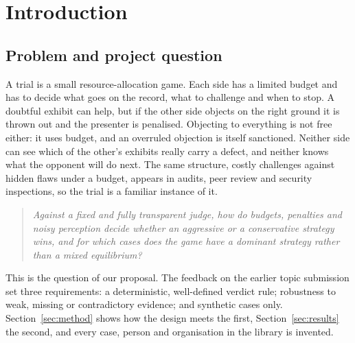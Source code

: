 \section{Introduction}\label{sec:intro}

\subsection{Problem and project question}
A trial is a small resource-allocation game. Each side has a limited budget and has to decide what goes on the record, what to challenge and when to stop. A doubtful exhibit can help, but if the other side objects on the right ground it is thrown out and the presenter is penalised. Objecting to everything is not free either: it uses budget, and an overruled objection is itself sanctioned. Neither side can see which of the other's exhibits really carry a defect, and neither knows what the opponent will do next. The same structure, costly challenges against hidden flaws under a budget, appears in audits, peer review and security inspections, so the trial is a familiar instance of it.

\begin{quote}\itshape
Against a fixed and fully transparent judge, how do budgets, penalties and noisy perception decide whether an aggressive or a conservative strategy wins, and for which cases does the game have a dominant strategy rather than a mixed equilibrium?
\end{quote}

This is the question of our proposal. The feedback on the earlier topic submission set three requirements: a deterministic, well-defined verdict rule; robustness to weak, missing or contradictory evidence; and synthetic cases only. Section~\ref{sec:method} shows how the design meets the first, Section~\ref{sec:results} the second, and every case, person and organisation in the library is invented.

